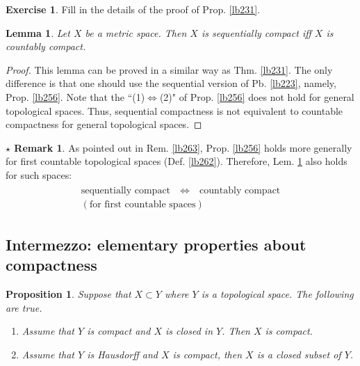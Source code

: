 \documentclass[12pt,b5paper,notitlepage]{article}
\theoremstyle{definition}
\newtheorem{exe}[df]{Exercise}
\newtheorem{srem}[df]{$\star$ Remark}
\theoremstyle{plain}
\newtheorem{pp}[df]{Proposition}
\newtheorem{lm}[df]{Lemma}
\numberwithin{equation}{section}
\begin{document}
\begin{exe}
Fill in the details of the proof of Prop. \ref{lb231}.
\end{exe}



\begin{lm}\label{lb247}
Let $X$ be a metric space. Then $X$ is sequentially compact iff $X$ is countably compact. 
\end{lm}

\begin{proof}
This lemma can be proved in a similar way as Thm. \ref{lb231}. The only difference is that one should use the sequential version of Pb. \ref{lb223}, namely, Prop. \ref{lb256}. Note that the ``(1)$\Leftrightarrow$(2)" of Prop. \ref{lb256} does not hold for general topological spaces. Thus, sequential compactness is not equivalent to countable compactness for general topological spaces. 
\end{proof}

\begin{srem}\label{lb264}
As pointed out in Rem. \ref{lb263}, Prop. \ref{lb256} holds more generally for first countable topological spaces (Def. \ref{lb262}). Therefore, Lem. \ref{lb247} also holds for such spaces:
\begin{gather}
\begin{gathered}
\text{sequentially compact}\quad\Longleftrightarrow\quad \text{countably compact}\\
(\text{for first countable spaces})
\end{gathered}
\end{gather}
\end{srem}



\subsection{Intermezzo: elementary properties about compactness}






\begin{pp}\label{lb233}
Suppose that $X\subset Y$ where $Y$ is a topological space. The following are true.
\begin{enumerate}
\item Assume that $Y$ is compact and $X$ is closed in $Y$. Then $X$ is compact.
\item Assume that $Y$ is Hausdorff and $X$ is compact, then $X$ is a closed subset of $Y$. 
\end{enumerate} 
\end{pp}
\end{document}
